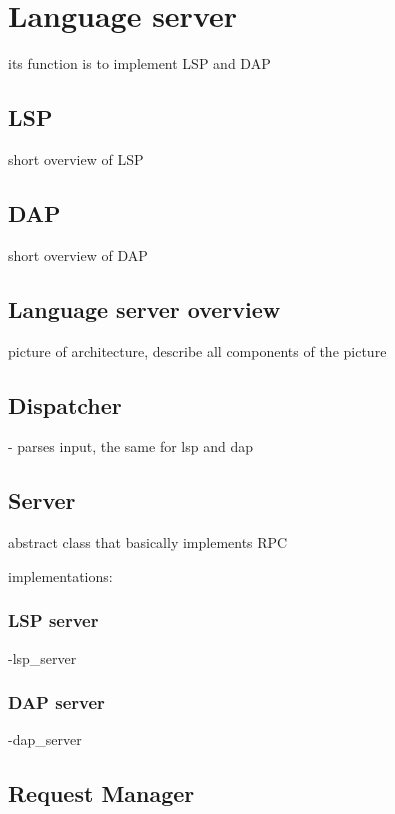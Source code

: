 \chapter{Language server}

its function is to implement LSP and DAP

\section{LSP}
short overview of LSP
\section{DAP}
short overview of DAP
\section{Language server overview}
picture of architecture, describe all components of the picture


\section{Dispatcher}
- parses input, the same for lsp and dap

\section{Server}
abstract class that basically implements RPC

implementations: 
\subsection{LSP server}
-lsp\_server
\subsection{DAP server}
-dap\_server
\section{Request Manager}


